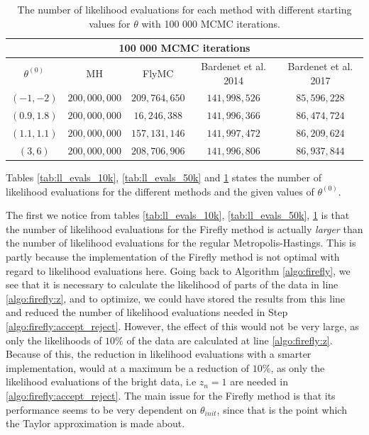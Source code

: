  \begin{table}[ht]
    \centering
\begin{tabular}{|c|c|c|c|c|}
  \hline
    \multicolumn{5}{|c|}{100 000 MCMC iterations} \\
    \hline
\hline
        $\theta^{\left(0\right)}$ &  MH & FlyMC & Bardenet et al. 2014 & Bardenet et al. 2017\\ 
         \hline \hline$\left(-1, -2\right)$ & $200,000,000$ & $209,764,650$ & $141,998,526$ & $85,596,228$ \\
        $\left(0.9, 1.8\right)$ & $200,000,000$ & $16,246,388$ & $141,996,366$ & $86,474,724$ \\
        $ \left(1.1, 1.1\right)$ & $200,000,000$ & $157,131,146$ & $141,997,472$ & $86,209,624$ \\
        $\left(3,6\right)$ & $200,000,000$ & $208,706,906$ & $141,996,806$ & $86,937,844$
        \\ \hline
\end{tabular}
\caption{The number of likelihood evaluations for each method with different starting values for $\theta$ with 100 000 MCMC iterations.}
\label{tab:ll_evals_100k}
\end{table} 
 
 Tables \ref{tab:ll_evals_10k}, \ref{tab:ll_evals_50k} and \ref{tab:ll_evals_100k} states the number of likelihood evaluations for the different methods and the given values of $\theta^{\left(0\right)}$. 

 
The first we notice from tables \ref{tab:ll_evals_10k}, \ref{tab:ll_evals_50k}, \ref{tab:ll_evals_100k} is that the number of likelihood evaluations for the Firefly method is actually \textit{larger} than the number of likelihood evaluations for the regular Metropolis-Hastings. This is partly because the implementation of the Firefly method is not optimal with regard to likelihood evaluations here. Going back to Algorithm \ref{algo:firefly}, we see that it is necessary to calculate the likelihood of parts of the data in line \ref{algo:firefly:z}, and to optimize, we could have stored the results from this line and reduced the number of likelihood evaluations needed in Step \ref{algo:firefly:accept_reject}. However, the effect of this would not be very large, as only the likelihoods of $10\%$ of the data are calculated at line \ref{algo:firefly:z}. Because of this, the reduction in likelihood evaluations with a smarter implementation, would at a maximum be a reduction of $10\%$, as only the likelihood evaluations of the bright data, i.e $z_n = 1$ are needed in \ref{algo:firefly:accept_reject}. The main issue for the Firefly method is that its performance seems to be very dependent on $\theta_{init}$, since that is the point which the Taylor approximation is made about. 

